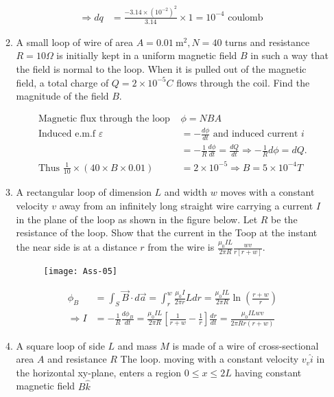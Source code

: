 \begin{enumerate}
\begin{enumerate}
\begin{answer}
\begin{align*}
		\Rightarrow d q&=\frac{-3.14 \times\left(10^{-2}\right)^{2}}{3.14} \times 1=10^{-4} \text { coulomb }
		\end{align*}
	\end{answer}
	\item A small loop of wire of area $A=0.01 \mathrm{~m}^{2}, N=40$ turns and resistance $R=10 \Omega$ is initially kept in a uniform magnetic field $B$ in such a way that the field is normal to the loop. When it is pulled out of the magnetic field, a total charge of $Q=2 \times 10^{-5} C$ flows through the coil. Find the magnitude of the field $B$.
	\begin{answer}
		\begin{align*}
		\text { Magnetic flux through the loop }& \phi=N B A\\
		\text { Induced e.m.f } \varepsilon&=-\frac{d \phi}{d t} \text { and induced current } i\\&=-\frac{1}{R} \frac{d \phi}{d t}=\frac{d Q}{d t} \Rightarrow-\frac{1}{R} d \phi=d Q \text {. }\\
		\text { Thus } \frac{1}{10} \times(40 \times B \times 0.01)&=2 \times 10^{-5} \Rightarrow B=5 \times 10^{-4} T
		\end{align*}
	\end{answer}
	\item A rectangular loop of dimension $L$ and width $w$ moves with a constant velocity $v$ away from an infinitely long straight wire carrying a current $I$ in the plane of the loop as shown in the figure below. Let $R$ be the resistance of the loop. Show that the current in the Toop at the instant the near side is at a distance $r$ from the wire is $\frac{\mu_{0} I L}{2 \pi R} \frac{w v}{r[r+w]}$.
	\begin{figure}[H]
		\centering
		\texttt{[image: Ass-05]}
	\end{figure}
\begin{answer}
	\begin{align*}
	\phi_{B}&=\int_{S} \vec{B} \cdot d \vec{a}=\int_{r}^{w} \frac{\mu_{0} I}{2 \pi r} L d r=\frac{\mu_{0} I L}{2 \pi R} \ln \left(\frac{r+w}{r}\right)\\
	\Rightarrow I&=-\frac{1}{R} \frac{d \phi_{B}}{d t}=\frac{\mu_{0} I L}{2 \pi R}\left[\frac{1}{r+w}-\frac{1}{r}\right] \frac{d r}{d t}=\frac{\mu_{0} I L w v}{2 \pi R r(r+w)}
	\end{align*}
\end{answer}
	\item A square loop of side $L$ and mass $M$ is made of a wire of cross-sectional area $A$ and resistance $R$ The loop. moving with a constant velocity $v_{v} \hat{i}$ in the horizontal xy-plane, enters a region $0 \leq x \leq 2 L$ having constant magnetic field $B \hat{k}$

\end{enumerate}
\end{enumerate}
